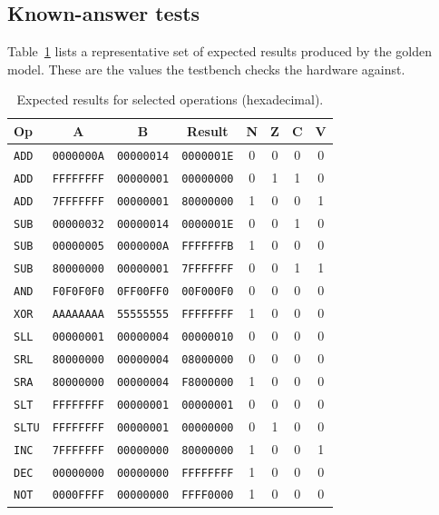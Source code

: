 \documentclass[11pt,a4paper]{article}
\begin{document}
\subsection{Known-answer tests}
Table~\ref{tab:kat} lists a representative set of expected results produced by the golden model. These are the values the testbench checks the hardware against.
\begin{table}[H]\centering\small
\begin{tabular}{@{}lccccccc@{}}\toprule
Op & A & B & Result & N & Z & C & V\\\midrule
\texttt{ADD} & \texttt{0000000A} & \texttt{00000014} & \texttt{0000001E} & 0 & 0 & 0 & 0 \\
\texttt{ADD} & \texttt{FFFFFFFF} & \texttt{00000001} & \texttt{00000000} & 0 & 1 & 1 & 0 \\
\texttt{ADD} & \texttt{7FFFFFFF} & \texttt{00000001} & \texttt{80000000} & 1 & 0 & 0 & 1 \\
\texttt{SUB} & \texttt{00000032} & \texttt{00000014} & \texttt{0000001E} & 0 & 0 & 1 & 0 \\
\texttt{SUB} & \texttt{00000005} & \texttt{0000000A} & \texttt{FFFFFFFB} & 1 & 0 & 0 & 0 \\
\texttt{SUB} & \texttt{80000000} & \texttt{00000001} & \texttt{7FFFFFFF} & 0 & 0 & 1 & 1 \\
\texttt{AND} & \texttt{F0F0F0F0} & \texttt{0FF00FF0} & \texttt{00F000F0} & 0 & 0 & 0 & 0 \\
\texttt{XOR} & \texttt{AAAAAAAA} & \texttt{55555555} & \texttt{FFFFFFFF} & 1 & 0 & 0 & 0 \\
\texttt{SLL} & \texttt{00000001} & \texttt{00000004} & \texttt{00000010} & 0 & 0 & 0 & 0 \\
\texttt{SRL} & \texttt{80000000} & \texttt{00000004} & \texttt{08000000} & 0 & 0 & 0 & 0 \\
\texttt{SRA} & \texttt{80000000} & \texttt{00000004} & \texttt{F8000000} & 1 & 0 & 0 & 0 \\
\texttt{SLT} & \texttt{FFFFFFFF} & \texttt{00000001} & \texttt{00000001} & 0 & 0 & 0 & 0 \\
\texttt{SLTU} & \texttt{FFFFFFFF} & \texttt{00000001} & \texttt{00000000} & 0 & 1 & 0 & 0 \\
\texttt{INC} & \texttt{7FFFFFFF} & \texttt{00000000} & \texttt{80000000} & 1 & 0 & 0 & 1 \\
\texttt{DEC} & \texttt{00000000} & \texttt{00000000} & \texttt{FFFFFFFF} & 1 & 0 & 0 & 0 \\
\texttt{NOT} & \texttt{0000FFFF} & \texttt{00000000} & \texttt{FFFF0000} & 1 & 0 & 0 & 0 \\
\bottomrule
\end{tabular}
\caption{Expected results for selected operations (hexadecimal).}\label{tab:kat}
\end{table}
\end{document}
